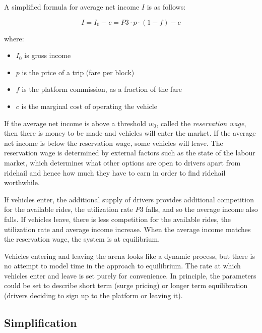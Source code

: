 \documentclass[
  letterpaper,
]{article}
\begin{document}
A simplified formula for average net income \(I\) is as follows:

\[
I = I_0 - c
  = P3 \cdot p \cdot (1 - f) - c
\]

where:

\begin{itemize}
\item
  \(I_0\) is gross income
\item
  \(p\) is the price of a trip (fare per block)
\item
  \(f\) is the platform commission, as a fraction of the fare
\item
  \(c\) is the marginal cost of operating the vehicle
\end{itemize}

If the average net income is above a threshold \(w_0\), called the
\emph{reservation wage}, then there is money to be made and vehicles
will enter the market. If the average net income is below the
reservation wage, some vehicles will leave. The reservation wage is
determined by external factors such as the state of the labour market,
which determines what other options are open to drivers apart from
ridehail and hence how much they have to earn in order to find ridehail
worthwhile.

If vehicles enter, the additional supply of drivers provides additional
competition for the available rides, the utilization rate \(P3\) falls,
and so the average income also falls. If vehicles leave, there is less
competition for the available rides, the utilization rate and average
income increase. When the average income matches the reservation wage,
the system is at equilibrium.

Vehicles entering and leaving the arena looks like a dynamic process,
but there is no attempt to model time in the approach to equilibrium.
The rate at which vehicles enter and leave is set purely for
convenience. In principle, the parameters could be set to describe short
term (surge pricing) or longer term equilibration (drivers deciding to
sign up to the platform or leaving it).

\hypertarget{simplification}{%
\subsection{Simplification}\label{simplification}}
\end{document}

